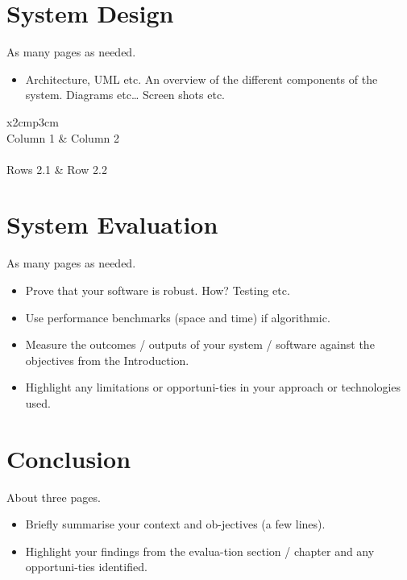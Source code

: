 \chapter{System Design}
As many pages as needed.
\begin{itemize}
\item Architecture, UML etc. An overview of the different components of the system. Diagrams etc… Screen shots etc.
\end{itemize}
\begin{table}[h]
  \centering
  \begin{tabular}{x{2cm}p{3cm}}
    \toprule \\
    Column 1 & Column 2 \\
    \midrule \\
    Rows 2.1 & Row 2.2 \\
    \bottomrule
  \end{tabular}
  \caption{A table.}
  \label{table:mytable}
\end{table}

\chapter{System Evaluation}
As many pages as needed.
\begin{itemize}
\item Prove that your software is robust. How? Testing etc. 
\item Use performance benchmarks (space and time) if algorithmic.
\item Measure the outcomes / outputs of your system / software against the objectives from the Introduction.
\item Highlight any limitations or opportuni-ties in your approach or technologies used.
\end{itemize}

\chapter{Conclusion}
About three pages.
\begin{itemize}
\item Briefly summarise your context and ob-jectives (a few lines).
\item Highlight your findings from the evalua-tion section / chapter and any opportuni-ties identified.
\end{itemize}